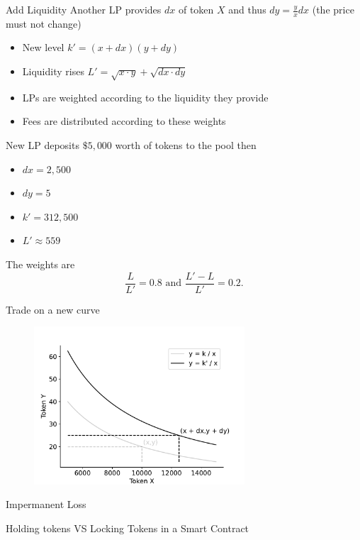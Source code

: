 \documentclass{beamer}
\begin{document}
\begin{frame}{Add Liquidity}
\footnotesize
Another LP provides $dx$ of token $X$ and thus $dy=\frac{y}{x}dx$ (the price must not change)
\begin{itemize}
\item New level $k' = (x+dx)(y+dy)$
\item Liquidity rises $L' = \sqrt{x\cdot y} + \sqrt{dx\cdot dy}$
\item LPs are weighted according to the liquidity they provide
\item Fees are distributed according to these weights
\end{itemize}
\begin{tcolorbox}[enhanced,drop shadow, title=Example]
    \footnotesize
    New LP deposits $\$5,000$ worth of tokens to the pool then  
    \begin{itemize}
      \item $dx = 2,500$
      \item $dy = 5$
      \item $k' = 312,500$
      \item $L'\approx 559$
    \end{itemize}
    The weights are 
    $$
    \frac{L}{L'} = 0.8\text{ and }\frac{L'-L}{L'} = 0.2.
    $$
\end{tcolorbox}    
\end{frame}
\begin{frame}{Trade on a new curve}
\begin{figure}[!ht]
    \includegraphics[width = 0.7\textwidth]{../../Figures/AMM_after_drop.pdf}
    \centering
    \label{fig:AMM_after_drop}
\end{figure}
\end{frame}
\begin{frame}{Impermanent Loss}
\begin{center}
Holding tokens VS Locking Tokens in a Smart Contract
\end{center}
\end{frame}
\end{document}
